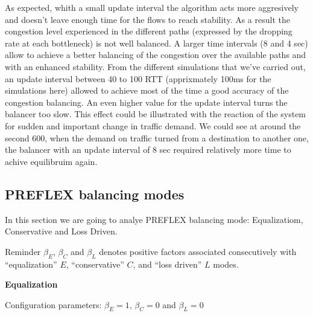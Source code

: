 As expected, whith a small update interval the algorithm acts more aggresively and doesn't leave enough time for the flows to reach stability. As a result the congestion level experienced in the different paths (expressed by the dropping rate at each bottleneck) is not well balanced. A larger time intervals (8 and 4 sec) allow to achieve a better balancing of the congestion over the available paths and with an enhanced stability. From the different simulations that we've carried out, an update interval between 40 to 100 RTT (apprixmately 100ms for the simulations here) allowed to achieve most of the time a good accuracy of the congestion balancing. An even higher value for the update interval turns the balancer too slow. This effect could be illustrated with the reaction of the system for sudden and important change in traffic demand. We could see at around the second 600, when the demand on traffic turned from a destination to another one, the balancer with an update interval of 8 sec required relatively more time to achive equilibruim again.    
 
 \clearpage


\subsection{PREFLEX balancing modes}

In this section we are going to analye PREFLEX balancing mode: Equalizatiom, Conservative and Loss Driven.

Reminder
$\beta_{E}$, $\beta_{C}$ and $\beta_{L}$ denotes positive factors associated consecutively with “equalization” $E$, “conservative” $C$, and “loss driven” $L$ modes.

{\bf Equalization}

Configuration parameters: $\beta_{E}=1$, $\beta_{C}=0$ and $\beta_{L}=0$

